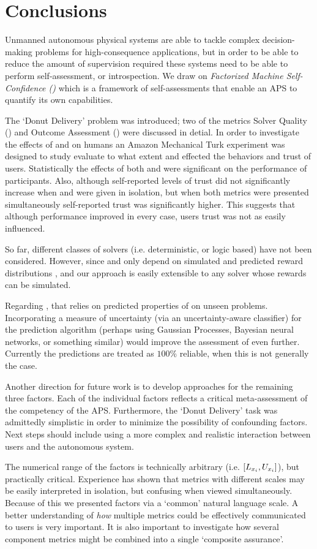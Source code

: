 \section{Conclusions} \label{sec:conclusions}
Unmanned autonomous physical systems are able to tackle complex decision-making problems for high-consequence applications, but in order to be able to reduce the amount of supervision required these systems need to be able to perform self-assessment, or introspection. We draw on \emph{Factorized Machine Self-Confidence (\famsec)} which is a framework of self-assessments that enable an APS to quantify its own capabilities.

The `Donut Delivery' problem was introduced; two of the \famsec{} metrics Solver Quality (\xQ) and Outcome Assessment (\xO) were discussed in detial. In order to investigate the effects of \xQ{} and \xO{} on humans an Amazon Mechanical Turk experiment was designed to study evaluate to what extent \xQ{} and \xO{} effected the behaviors and trust of users. Statistically the effects of both \xQ{} and \xO{} were significant on the performance of participants. Also, although self-reported levels of trust did not significantly increase when \xQ{} and \xO{} were given in isolation, but when both metrics were presented simultaneously self-reported trust was significantly higher. This suggests that although performance improved in every case, users trust was not as easily influenced.

So far, different classes of solvers (i.e. deterministic, or logic based) have not been considered. However, since \xQ{} and \xO{} only depend on simulated and predicted reward distributions \rwd{}, and \rwdtrust{} our approach is easily extensible to any solver whose rewards can be simulated. 

Regarding \xQ{}, that relies on predicted properties of \rwdtrust{} on unseen problems. Incorporating a measure of uncertainty (via an uncertainty-aware classifier) for the prediction algorithm (perhaps using Gaussian Processes, Bayesian neural networks, or something similar) would improve the assessment of \xQ{} even further. Currently the predictions are treated as $100\%$ reliable, when this is not generally the case.

Another direction for future work is to develop approaches for the remaining three \famsec{} factors. Each of the individual factors reflects a critical meta-assessment of the competency of the APS. Furthermore, the `Donut Delivery' task was admittedly simplistic in order to minimize the possibility of confounding factors. Next steps should include using a more complex and realistic interaction between users and the autonomous system.

The numerical range of the \famsec{} factors is technically arbitrary (i.e. $[L_{x_i},U_{x_i}]$), but practically critical. Experience has shown that metrics with different scales may be easily interpreted in isolation, but confusing when viewed simultaneously. Because of this we presented factors via a `common' natural language scale. A better understanding of \emph{how} multiple metrics could be effectively communicated to users is very important. It is also important to investigate how several component metrics might be combined into a single `composite assurance'.
